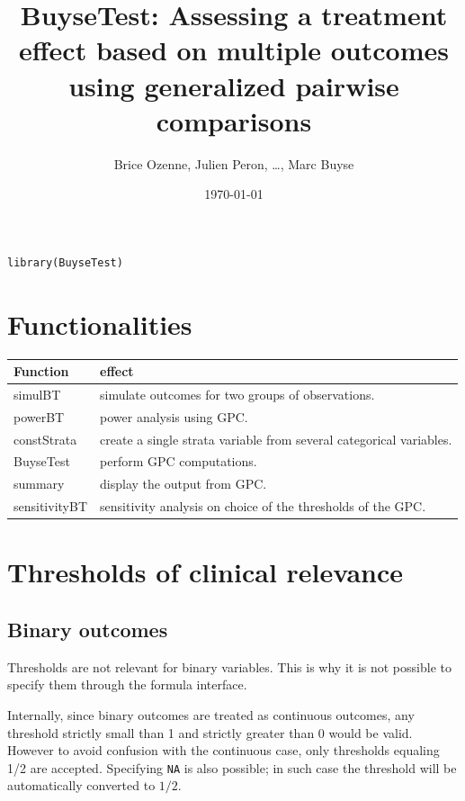 \documentclass{article}
\author{Brice Ozenne, Julien Peron, \ldots{}, Marc Buyse}
\date{\today}
\title{BuyseTest: Assessing a treatment effect based on multiple outcomes using generalized pairwise comparisons}
\begin{document}
\maketitle
\lstset{language=r,label= ,caption= ,captionpos=b,numbers=none}
\begin{lstlisting}
library(BuyseTest)
\end{lstlisting}

\section{Functionalities}
\label{sec:org8e91f09}

\begin{center}
\begin{tabular}{ll}
Function & effect\\
\hline
simulBT & simulate outcomes for two groups of observations.\\
powerBT & power analysis using GPC.\\
constStrata & create a single strata variable from several categorical variables.\\
BuyseTest & perform GPC computations.\\
summary & display the output from GPC.\\
sensitivityBT & sensitivity analysis on choice of the thresholds of the GPC.\\
\end{tabular}
\end{center}



\section{Thresholds of clinical relevance}
\label{sec:org32d575b}

\subsection{Binary outcomes}
\label{sec:orga5a4361}

Thresholds are not relevant for binary variables. This is why it is
not possible to specify them through the formula interface. 

\bigskip

Internally, since binary outcomes are treated as continuous outcomes,
any threshold strictly small than 1 and strictly greater than 0 would
be valid. However to avoid confusion with the continuous case, only
thresholds equaling 1/2 are accepted. Specifying \texttt{NA} is also possible;
in such case the threshold will be automatically converted to \(1/2\).
\end{document}
